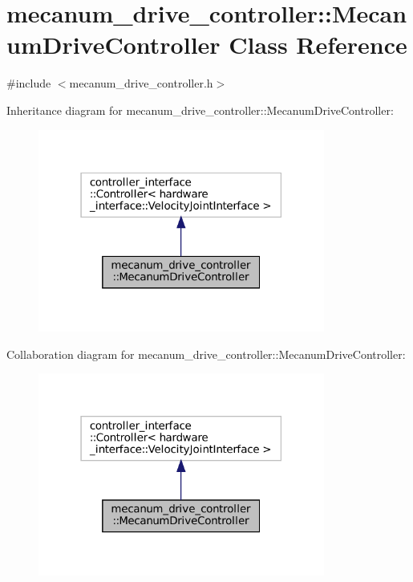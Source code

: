 \hypertarget{classmecanum__drive__controller_1_1MecanumDriveController}{}\section{mecanum\+\_\+drive\+\_\+controller\+:\+:Mecanum\+Drive\+Controller Class Reference}
\label{classmecanum__drive__controller_1_1MecanumDriveController}


{\ttfamily \#include $<$mecanum\+\_\+drive\+\_\+controller.\+h$>$}



Inheritance diagram for mecanum\+\_\+drive\+\_\+controller\+:\+:Mecanum\+Drive\+Controller\+:
\nopagebreak
\begin{figure}[H]
\begin{center}
\leavevmode
\includegraphics[width=267pt]{classmecanum__drive__controller_1_1MecanumDriveController__inherit__graph}
\end{center}
\end{figure}


Collaboration diagram for mecanum\+\_\+drive\+\_\+controller\+:\+:Mecanum\+Drive\+Controller\+:
\nopagebreak
\begin{figure}[H]
\begin{center}
\leavevmode
\includegraphics[width=267pt]{classmecanum__drive__controller_1_1MecanumDriveController__coll__graph}
\end{center}
\end{figure}

